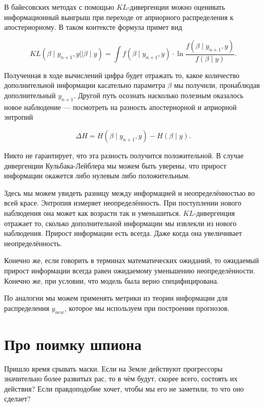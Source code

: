 \documentclass[12pt, a4paper, oneside]{extreport}
\def \b{\beta}
\theoremstyle{plain}              %
\theoremstyle{definition}         %
\begin{document}
 
 В байесовских методах с помощью $KL$-дивергенции можно оценивать информационный выигрыш при переходе от априорного распределения к апостериорному. В таком контексте формула примет вид 
 
 \[ KL(\b \mid y_{n+1}, y || \b \mid y) =  \int f(\b \mid y_{n+1}, y) \cdot \ln \frac{f(\b \mid y_{n+1}, y)}{f(\b \mid y)}. \]

Полученная в ходе вычислений цифра будет отражать то, какое количество дополнительной информации касательно параметра $\b$ мы получили, пронаблюдав дополнительный $y_{n+1}$. Другой путь осознать насколько полезным оказалось новое наблюдение  --- посмотреть на разность апостериорной и априорной энтропий

\[ \Delta H =  H(\b \mid y_{n+1}, y) - H(\b \mid y).\]

Никто не гарантирует, что эта разность получится положительной.  В случае дивергенции Кульбака-Лейблера мы можем быть уверены, что прирост информации окажется либо нулевым либо положительным.  

Здесь мы можем увидеть разницу между информацией и неопределённостью во всей красе. Энтропия измеряет неопределённость. При поступлении нового наблюдения она может как возрасти так и уменьшиться.  $KL$-дивергенция отражает то, сколько дополнительной информации мы извлекли из нового наблюдения. Прирост информации есть всегда. Даже когда она увеличивает неопределённость. 

Конечно же, если говорить в терминах математических ожиданий, то ожидаемый прирост информации всегда равен ожидаемому уменьшению неопределённости.  Конечно же, при условии, что модель была верно специфицирована.  

По аналогии мы можем применять метрики из теории информации для распределения $y_{new}$, которое мы используем при построении прогнозов.


\section{Про поимку шпиона} 

Пришло время срывать маски.  Если на Земле действуют прогрессоры значительно более развитых рас, то в чём будут, скорее всего, состоять их действия? Если правдоподобие хочет, чтобы мы его не заметили, то что оно сделает?
\end{document}
